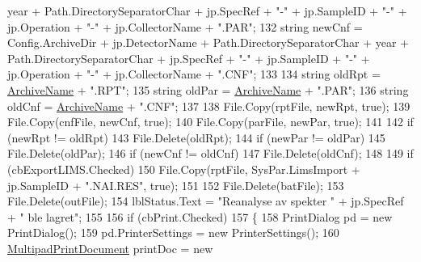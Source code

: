 \begin{DoxyCode}
      year + Path.DirectorySeparatorChar + jp.SpecRef + \textcolor{stringliteral}{"-"} + jp.SampleID + \textcolor{stringliteral}{"-"} + jp.Operation + \textcolor{stringliteral}{"-"} + 
      jp.CollectorName + \textcolor{stringliteral}{".PAR"};
132                     \textcolor{keywordtype}{string} newCnf = Config.ArchiveDir + jp.DetectorName + Path.DirectorySeparatorChar + 
      year + Path.DirectorySeparatorChar + jp.SpecRef + \textcolor{stringliteral}{"-"} + jp.SampleID + \textcolor{stringliteral}{"-"} + jp.Operation + \textcolor{stringliteral}{"-"} + 
      jp.CollectorName + \textcolor{stringliteral}{".CNF"};
133 
134                     \textcolor{keywordtype}{string} oldRpt = \hyperlink{class_scintilab_1_1_form_job_report_a6befd8e22fc03d7db559bc5819b9001a}{ArchiveName} + \textcolor{stringliteral}{".RPT"};
135                     \textcolor{keywordtype}{string} oldPar = \hyperlink{class_scintilab_1_1_form_job_report_a6befd8e22fc03d7db559bc5819b9001a}{ArchiveName} + \textcolor{stringliteral}{".PAR"};
136                     \textcolor{keywordtype}{string} oldCnf = \hyperlink{class_scintilab_1_1_form_job_report_a6befd8e22fc03d7db559bc5819b9001a}{ArchiveName} + \textcolor{stringliteral}{".CNF"};
137 
138                     File.Copy(rptFile, newRpt, \textcolor{keyword}{true});
139                     File.Copy(cnfFile, newCnf, \textcolor{keyword}{true});
140                     File.Copy(parFile, newPar, \textcolor{keyword}{true});
141 
142                     \textcolor{keywordflow}{if} (newRpt != oldRpt)
143                         File.Delete(oldRpt);
144                     \textcolor{keywordflow}{if} (newPar != oldPar)
145                         File.Delete(oldPar);
146                     \textcolor{keywordflow}{if} (newCnf != oldCnf)
147                         File.Delete(oldCnf);
148 
149                     \textcolor{keywordflow}{if} (cbExportLIMS.Checked)
150                         File.Copy(rptFile, SysPar.LimsImport + jp.SampleID + \textcolor{stringliteral}{".NAI.RES"}, \textcolor{keyword}{true});
151 
152                     File.Delete(batFile);
153                     File.Delete(outFile);
154                     lblStatus.Text = \textcolor{stringliteral}{"Reanalyse av spekter "} + jp.SpecRef + \textcolor{stringliteral}{" ble lagret"};
155 
156                     \textcolor{keywordflow}{if} (cbPrint.Checked)
157                     \{
158                         PrintDialog pd = \textcolor{keyword}{new} PrintDialog();
159                         pd.PrinterSettings = \textcolor{keyword}{new} PrinterSettings();
160                         \hyperlink{class_multipad_print_document}{MultipadPrintDocument} printDoc = \textcolor{keyword}{new} 

\end{DoxyCode}
